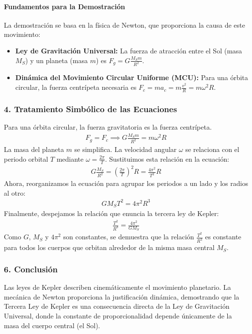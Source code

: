 \paragraph{Fundamentos para la Demostración}
La demostración se basa en la física de Newton, que proporciona la causa de este movimiento:
\begin{itemize}
    \item \textbf{Ley de Gravitación Universal:} La fuerza de atracción entre el Sol (masa $M_S$) y un planeta (masa $m$) es $F_g = G \frac{M_S m}{R^2}$.
    \item \textbf{Dinámica del Movimiento Circular Uniforme (MCU):} Para una órbita circular, la fuerza centrípeta necesaria es $F_c = m a_c = m \frac{v^2}{R} = m \omega^2 R$.
\end{itemize}

\subsubsection*{4. Tratamiento Simbólico de las Ecuaciones}
Para una órbita circular, la fuerza gravitatoria es la fuerza centrípeta.
\begin{gather}
    F_g = F_c \implies G \frac{M_S m}{R^2} = m \omega^2 R
\end{gather}
La masa del planeta $m$ se simplifica. La velocidad angular $\omega$ se relaciona con el periodo orbital $T$ mediante $\omega = \frac{2\pi}{T}$. Sustituimos esta relación en la ecuación:
\begin{gather}
    G \frac{M_S}{R^2} = \left(\frac{2\pi}{T}\right)^2 R = \frac{4\pi^2}{T^2} R
\end{gather}
Ahora, reorganizamos la ecuación para agrupar los periodos a un lado y los radios al otro:
\begin{gather}
    G M_S T^2 = 4\pi^2 R^3
\end{gather}
Finalmente, despejamos la relación que enuncia la tercera ley de Kepler:
\begin{gather}
    \frac{T^2}{R^3} = \frac{4\pi^2}{G M_S}
\end{gather}
Como $G$, $M_S$ y $4\pi^2$ son constantes, se demuestra que la relación $\frac{T^2}{R^3}$ es constante para todos los cuerpos que orbitan alrededor de la misma masa central $M_S$.

\subsubsection*{6. Conclusión}
\begin{cajaconclusion}
Las leyes de Kepler describen cinemáticamente el movimiento planetario. La mecánica de Newton proporciona la justificación dinámica, demostrando que la Tercera Ley de Kepler es una consecuencia directa de la Ley de Gravitación Universal, donde la constante de proporcionalidad depende únicamente de la masa del cuerpo central (el Sol).
\end{cajaconclusion}

